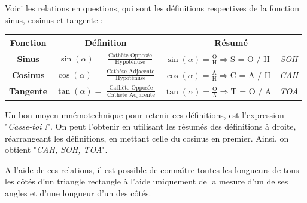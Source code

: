 \documentclass[a4paper]{article}
\begin{document}
\newpage

			Voici les relations en questions, qui sont les définitions respectives de la fonction sinus, cosinus et tangente :
			
			\begin{center}
				
				\setcellgapes{2.5mm}
				\makegapedcells
				\begin{tabular}{|c|ccc|}
					\hline
					\textbf{Fonction} & \textbf{Définition}                                                                 & \multicolumn{2}{c|}{\textbf{Résumé}} \\
					\hline
					\textbf{Sinus}    & $\sin(\alpha) =$ {\Large $\frac{\text{Cathète Opposée}}{\text{Hypoténuse}}$       } & $\sin(\alpha) = \frac{\text{O}}{\text{H}} \Longrightarrow \text{S = O / H} $ & \textit{SOH} \\
					\textbf{Cosinus}  & $\cos(\alpha) =$ {\Large $\frac{\text{Cathète Adjacente}}{\text{Hypoténuse}}$     } & $\cos(\alpha) = \frac{\text{A}}{\text{H}} \Longrightarrow \text{C = A / H} $ & \textit{CAH} \\
					\textbf{Tangente} & $\tan(\alpha) =$ {\Large $\frac{\text{Cathète Opposée}}{\text{Cathète Adjacente}}$} & $\tan(\alpha) = \frac{\text{O}}{\text{A}} \Longrightarrow \text{T = O / A} $ & \textit{TOA} \\
					\hline
				\end{tabular}
			\end{center}

			Un bon moyen mnémotechnique pour retenir ces définitions, 
			est l'expression "\textit{Casse-toi !}". 
			On peut l'obtenir en utilisant les résumés des définitions à droite, 
			réarrangeant les définitions, en mettant celle du cosinus en premier.
			Ainsi, on obtient "\textit{CAH, SOH, TOA}".
			
			\medbreak

			A l'aide de ces relations, 
			il est possible de connaître toutes les longueurs de 
			tous les côtés d'un triangle rectangle à l'aide uniquement 
			de la mesure d'un de ses angles et d'une longueur d'un des côtés.

			
			
\end{document}
